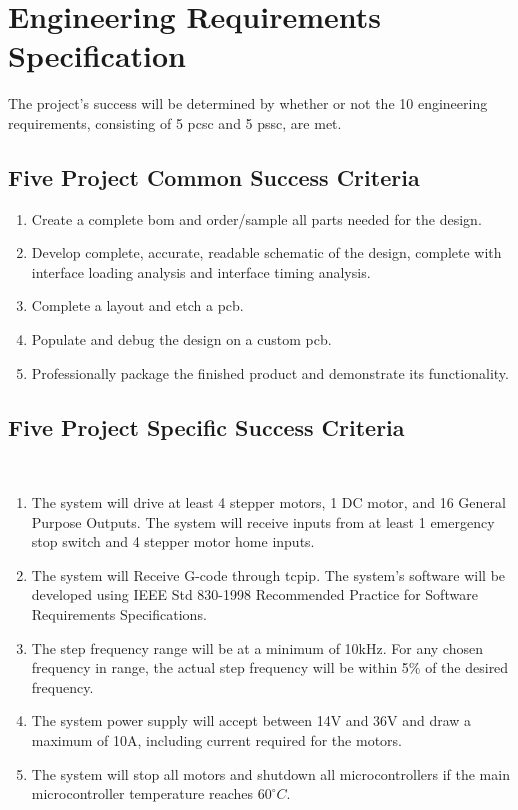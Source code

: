 \chapter{Engineering Requirements Specification}
The project's success will be determined by whether or not the 10 engineering requirements, consisting of 5 \gls{pcsc} and 5 \gls{pssc}, are met. 

\section{Five Project Common Success Criteria}
\begin{enumerate}
	\item Create a complete \gls{bom} and order/sample all parts needed for the design.
	\item Develop complete, accurate, readable schematic of the design, complete with interface loading analysis and interface timing analysis. 
	\item Complete a layout and etch a \gls{pcb}.
	\item Populate and debug the design on a custom \gls{pcb}.
	\item Professionally package the finished product and demonstrate its functionality.
\end{enumerate}

\section{Five Project Specific Success Criteria}\
\begin{enumerate}
	\item The system will drive at least 4 stepper motors, 1 DC motor, and 16 General Purpose Outputs.
The system will receive inputs from at least 1 emergency stop switch and 4 stepper motor home inputs.
	\item The system will Receive G-code through \gls{tcpip}.
The system’s software will be developed using IEEE Std 830-1998 Recommended Practice for Software Requirements Specifications.
	\item The step frequency range will be at a minimum of 10kHz.
For any chosen frequency in range, the actual step frequency will be within 5\% of the desired frequency.
	\item The system power supply will accept between 14V and 36V and draw a maximum of 10A, including current required for the motors. 
	\item The system will stop all motors and shutdown all microcontrollers if the main microcontroller temperature reaches $60^{\circ}C$.
\end{enumerate}


